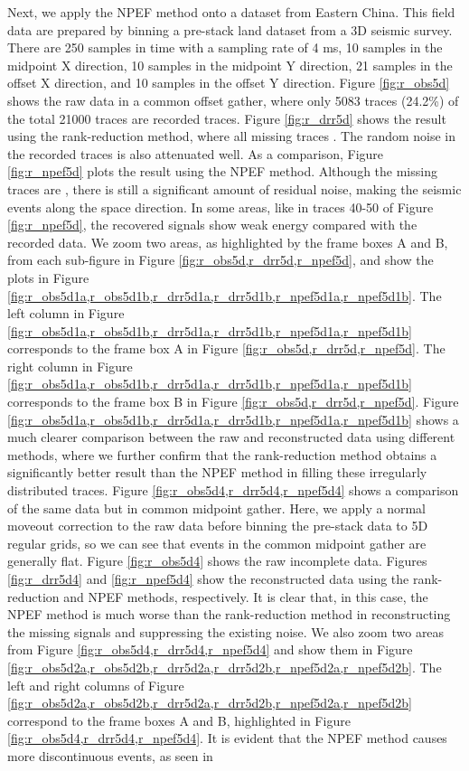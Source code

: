 Next, we apply the NPEF method onto a  dataset from Eastern China. This field data are prepared by binning a pre-stack land dataset from a 3D seismic survey. There are 250 samples in time with a sampling rate of 4 ms, 10 samples in the midpoint X direction, 10 samples in the midpoint Y direction, 21 samples in the offset X direction, and 10 samples in the offset Y direction. Figure \ref{fig:r_obs5d} shows the raw data in a common offset gather, where only 5083 traces (24.2\%) of the total 21000 traces are recorded traces. Figure \ref{fig:r_drr5d} shows the result using the rank-reduction method, where all missing traces . The random noise in the recorded traces is also attenuated well. As a comparison, Figure \ref{fig:r_npef5d} plots the result using the NPEF method. Although the missing traces are , there is still a significant amount of residual noise, making the seismic events  along the space direction. In some areas, like in traces 40-50 of Figure \ref{fig:r_npef5d}, the recovered signals show weak energy compared with the recorded data. We zoom  two areas, as highlighted by the frame boxes A and B, from each sub-figure in Figure \ref{fig:r_obs5d,r_drr5d,r_npef5d}, and show the plots in Figure \ref{fig:r_obs5d1a,r_obs5d1b,r_drr5d1a,r_drr5d1b,r_npef5d1a,r_npef5d1b}. The left column in Figure \ref{fig:r_obs5d1a,r_obs5d1b,r_drr5d1a,r_drr5d1b,r_npef5d1a,r_npef5d1b} corresponds to the frame box A in Figure \ref{fig:r_obs5d,r_drr5d,r_npef5d}. The right column in Figure \ref{fig:r_obs5d1a,r_obs5d1b,r_drr5d1a,r_drr5d1b,r_npef5d1a,r_npef5d1b} corresponds to the frame box B in Figure \ref{fig:r_obs5d,r_drr5d,r_npef5d}. Figure \ref{fig:r_obs5d1a,r_obs5d1b,r_drr5d1a,r_drr5d1b,r_npef5d1a,r_npef5d1b} shows a much clearer comparison between the raw and reconstructed data using different methods, where we further confirm that the rank-reduction method obtains a significantly better result than the NPEF method in filling these irregularly distributed traces.  Figure \ref{fig:r_obs5d4,r_drr5d4,r_npef5d4} shows a comparison of the same data but in common midpoint gather. Here, we apply a normal moveout correction to the raw data before binning the pre-stack data to 5D regular grids, so we can see that events in the common midpoint gather are generally flat. Figure \ref{fig:r_obs5d4} shows the raw incomplete data. Figures \ref{fig:r_drr5d4} and \ref{fig:r_npef5d4} show the reconstructed data using the rank-reduction and NPEF methods, respectively. It is clear that, in this case, the NPEF method is much worse than the rank-reduction method in reconstructing the missing signals and suppressing the existing noise. We also zoom  two areas from Figure \ref{fig:r_obs5d4,r_drr5d4,r_npef5d4} and show them in Figure \ref{fig:r_obs5d2a,r_obs5d2b,r_drr5d2a,r_drr5d2b,r_npef5d2a,r_npef5d2b}. The left and right columns of Figure \ref{fig:r_obs5d2a,r_obs5d2b,r_drr5d2a,r_drr5d2b,r_npef5d2a,r_npef5d2b} correspond to the frame boxes A and B, highlighted in Figure \ref{fig:r_obs5d4,r_drr5d4,r_npef5d4}. It is evident that the NPEF method causes more discontinuous events, as seen in 